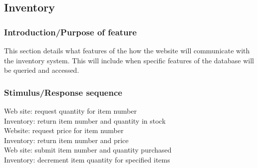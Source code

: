 \documentclass{scrreprt}
\theoremstyle{funreq}
\begin{document}
	\subsection{Inventory}
	\subsubsection{Introduction/Purpose of feature}
	This section details what features of the how the website will communicate with the inventory system.  This will include when specific features of the database will be queried and accessed.  
	
	\subsubsection{Stimulus/Response sequence}
	Web site: request quantity for item number\\
	Inventory: return item number and quantity in stock\\
	Website: request price for item number\\
	Inventory: return item number and price\\
	Web site: submit item number and quantity purchased\\
	Inventory: decrement item quantity for specified items\\
	
\end{document}
